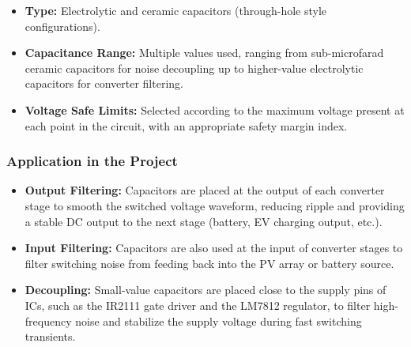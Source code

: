 \begin{itemize}
    \item \textbf{Type:} Electrolytic and ceramic capacitors (through-hole style configurations).
    \item \textbf{Capacitance Range:} Multiple values used, ranging from sub-microfarad ceramic capacitors for noise decoupling up to higher-value electrolytic capacitors for converter filtering.
    \item \textbf{Voltage Safe Limits:} Selected according to the maximum voltage present at each point in the circuit, with an appropriate safety margin index.
\end{itemize}

\subsubsection{Application in the Project}
\begin{itemize}
    \item \textbf{Output Filtering:} Capacitors are placed at the output of each converter stage to smooth the switched voltage waveform, reducing ripple and providing a stable DC output to the next stage (battery, EV charging output, etc.).
    \item \textbf{Input Filtering:} Capacitors are also used at the input of converter stages to filter switching noise from feeding back into the PV array or battery source.
    \item \textbf{Decoupling:} Small-value capacitors are placed close to the supply pins of ICs, such as the IR2111 gate driver and the LM7812 regulator, to filter high-frequency noise and stabilize the supply voltage during fast switching transients.
\end{itemize}